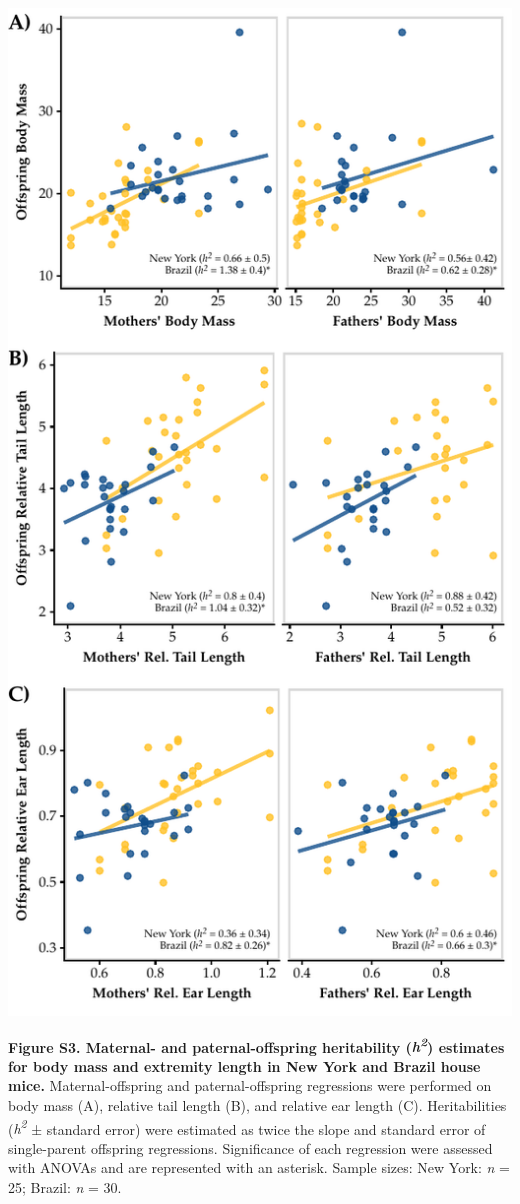 \documentclass[
]{article}
\begin{document}
\newpage

\includegraphics{../results/figures/FigS3_h2.pdf}

\textbf{Figure S3. Maternal- and paternal-offspring heritability
(\emph{h\textsuperscript{2}}) estimates for body mass and extremity
length in New York and Brazil house mice.} Maternal-offspring and
paternal-offspring regressions were performed on body mass (A), relative
tail length (B), and relative ear length (C). Heritabilities
(\emph{h\textsuperscript{2}} ± standard error) were estimated as twice
the slope and standard error of single-parent offspring regressions.
Significance of each regression were assessed with ANOVAs and are
represented with an asterisk. Sample sizes: New York: \emph{n} = 25;
Brazil: \emph{n} = 30.
\end{document}
